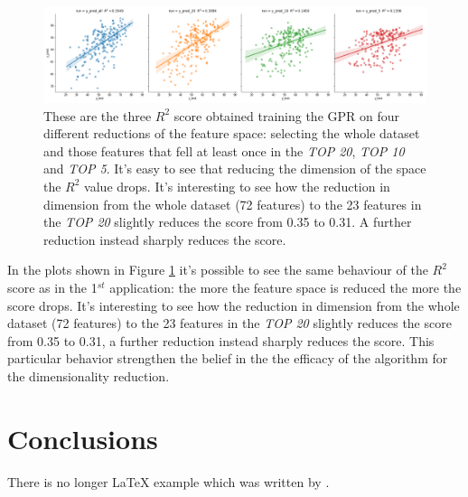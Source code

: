 \documentclass{article}
\begin{document}
\begin{figure}[h]
	\centerline{\includegraphics[width=1.3\textwidth]{four_graphs}}
	\caption{These are the three $R^2$ score obtained training the GPR on four different reductions of the feature space: selecting the whole dataset and those features that fell at least once in the \emph{TOP 20}, \emph{TOP 10} and \emph{TOP 5}. It's easy to see that reducing the dimension of the space the $R^2$ value drops. It's interesting to see how the reduction in dimension from the whole dataset (72 features) to the 23 features in the \emph{TOP 20} slightly reduces the score from 0.35 to 0.31. A further reduction instead sharply reduces the score.}
	\label{fig:Cardio_graphs}
	\centering
\end{figure}

In the plots shown in Figure \ref{fig:Cardio_graphs} it's possible to see the same behaviour of the $R^2$ score as in the 1$^{st}$ application: the more the feature space is reduced the more the score drops. It's interesting to see how the reduction in dimension from the whole dataset (72 features) to the 23 features in the \emph{TOP 20} slightly reduces the score from 0.35 to 0.31, a further reduction instead sharply reduces the score. This particular behavior strengthen the belief in the the efficacy of the algorithm for the dimensionality reduction.



\section*{Conclusions}
There is no longer \LaTeX{} example which was written by \cite{doe}.

\newpage
\end{document}
